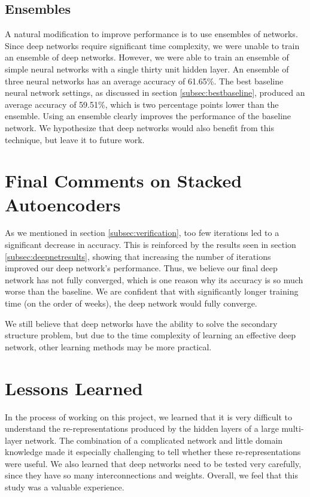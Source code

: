 \documentclass[letterpaper,twocolumn,12pt]{article}
\begin{document}
\subsection{Ensembles}
A natural modification to improve performance is to use ensembles of networks.
Since deep networks require significant time complexity, we were unable to train an ensemble of deep networks.
However, we were able to train an ensemble of simple neural networks with a single thirty unit hidden layer.
An ensemble of three neural networks has an average accuracy of 61.65\%.
The best baseline neural network settings, as discussed in section \ref{subsec:bestbaseline},
produced an average accuracy of 59.51\%, which is two percentage points lower than the ensemble.
Using an ensemble clearly improves the performance of the baseline network.
We hypothesize that deep networks would also benefit from this technique, but leave it to future work.



\section{Final Comments on Stacked Autoencoders}
As we mentioned in section \ref{subsec:verification}, too few iterations led to a significant decrease in accuracy.
This is reinforced by the results seen in section \ref{subsec:deepnetresults}, showing that increasing the number of iterations improved our deep network's performance.
Thus, we believe our final deep network has not fully converged, which is one reason why its accuracy is so much worse than the baseline.
We are confident that with significantly longer training time (on the order of weeks), the deep network would fully converge.

We still believe that deep networks have the ability to solve the secondary structure problem, but due to the time complexity of learning an effective deep network, other learning methods may be more practical.

\section{Lessons Learned}
In the process of working on this project, we learned that it is very difficult to understand the re-representations produced by the hidden layers of a large multi-layer network.
The combination of a complicated network and little domain knowledge made it especially challenging to tell whether these re-representations were useful.
We also learned that deep networks need to be tested very carefully, since they have so many interconnections and weights.
Overall, we feel that this study was a valuable experience.
\end{document}
